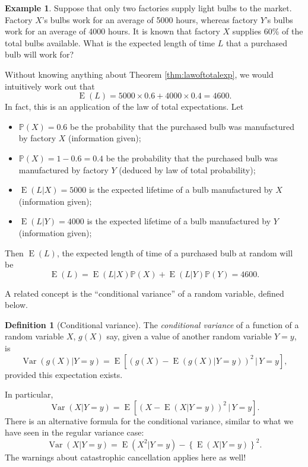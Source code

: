 \documentclass[
]{book}
\providecommand{\tightlist}{%
  \setlength{\itemsep}{0pt}\setlength{\parskip}{0pt}}
\DeclareMathOperator{\E}{E}
\DeclareMathOperator{\Var}{Var}
\newcommand{\bbP}{\mathbb{P}}
\theoremstyle{definition}
\newtheorem{definition}{Definition}[chapter]
\theoremstyle{definition}
\newtheorem{example}{Example}[chapter]
\theoremstyle{definition}
\theoremstyle{definition}
\theoremstyle{remark}
\begin{document}
\begin{example}
Suppose that only two factories supply light bulbs to the market. Factory \(X\)'s bulbs work for an average of 5000 hours, whereas factory \(Y\)'s bulbs work for an average of 4000 hours.
It is known that factory \(X\) supplies 60\% of the total bulbs available.
What is the expected length of time \(L\) that a purchased bulb will work for?

Without knowing anything about Theorem \ref{thm:lawoftotalexp}, we would intuitively work out that
\[
\E(L) = 5000 \times 0.6 + 4000 \times 0.4 = 4600.
\]
In fact, this is an application of the law of total expectations.
Let

\begin{itemize}
\tightlist
\item
  \(\bbP(X)=0.6\) be the probability that the purchased bulb was manufactured by factory \(X\) (information given);
\item
  \(\bbP(X)=1-0.6=0.4\) be the probability that the purchased bulb was manufactured by factory \(Y\) (deduced by law of total probability);
\item
  \(\E(L|X)=5000\) is the expected lifetime of a bulb manufactured by \(X\) (information given);
\item
  \(\E(L|Y)=4000\) is the expected lifetime of a bulb manufactured by \(Y\) (information given);
\end{itemize}

Then \(\E(L)\), the expected length of time of a purchased bulb at random will be
\[
\E(L) = \E(L|X)\bbP(X) + \E(L|Y) \bbP(Y) = 4600.
\]
\end{example}

A related concept is the ``conditional variance'' of a random variable, defined below.

\begin{definition}[Conditional variance]
The \emph{conditional variance} of a function of a random variable \(X\), \(g(X)\) say, given a value of another random variable \(Y=y\), is
\[
\Var(g(X)|Y=y) = \E \left[ \left(g(X) - \E(g(X)|Y=y)\right)^2 \,\Big|\, Y=y\right],
\]
provided this expectation exists.
\end{definition}

In particular,
\[
\Var(X|Y=y) = \E \left[ \left(X - \E(X|Y=y)\right)^2 \,\Big|\, Y=y\right].
\]
There is an alternative formula for the conditional variance, similar to what we have seen in the regular variance case:
\[
\Var(X|Y=y) = \E \left(X^2 | Y=y\right) - \left\{ \E(X|Y=y) \right\}^2.
\]
The warnings about catastrophic cancellation applies here as well!
\end{document}

